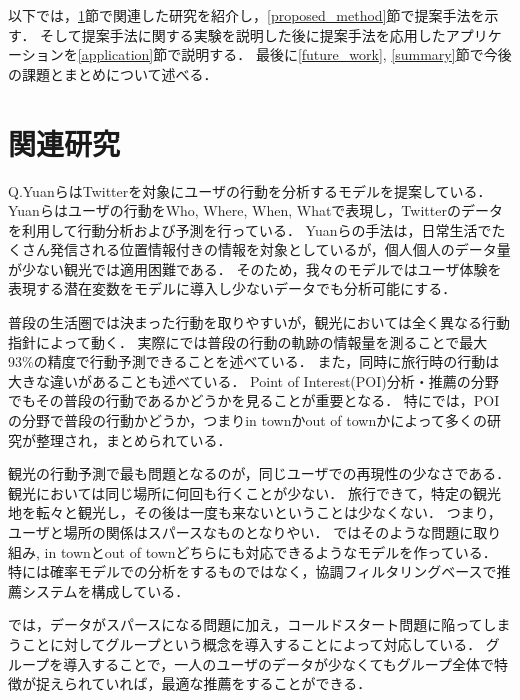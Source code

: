 \documentclass[a4j,10pt, twocolumn]{jarticle}
\begin{document}
以下では，\ref{related_work}節で関連した研究を紹介し，\ref{proposed_method}節で提案手法を示す．
そして提案手法に関する実験を説明した後に提案手法を応用したアプリケーションを\ref{application}節で説明する．
最後に\ref{future_work}, \ref{summary}節で今後の課題とまとめについて述べる．

\section{関連研究} \label{related_work}
Q.YuanらはTwitterを対象にユーザの行動を分析するモデルを提案している\cite{yuan2013and}\cite{yuan2015and}．
Yuanらはユーザの行動をWho, Where, When, Whatで表現し，Twitterのデータを利用して行動分析および予測を行っている．
Yuanらの手法は，日常生活でたくさん発信される位置情報付きの情報を対象としているが，個人個人のデータ量が少ない観光では適用困難である．
そのため，我々のモデルではユーザ体験を表現する潜在変数をモデルに導入し少ないデータでも分析可能にする．

普段の生活圏では決まった行動を取りやすいが，観光においては全く異なる行動指針によって動く．
実際に\cite{song2010limits}では普段の行動の軌跡の情報量を測ることで最大93\%の精度で行動予測できることを述べている．
また，同時に旅行時の行動は大きな違いがあることも述べている．
Point of Interest(POI)分析・推薦の分野でもその普段の行動であるかどうかを見ることが重要となる．
特に\cite{liu2017experimental}では，POIの分野で普段の行動かどうか，つまりin townかout of townかによって多くの研究が整理され，まとめられている．

観光の行動予測で最も問題となるのが，同じユーザでの再現性の少なさである．
観光においては同じ場所に何回も行くことが少ない．
旅行できて，特定の観光地を転々と観光し，その後は一度も来ないということは少なくない．
つまり，ユーザと場所の関係はスパースなものとなりやい．
\cite{ference2013location}\cite{yin2013lcars}\cite{wang2015geo}\cite{yin2016joint}ではそのような問題に取り組み, in townとout of townどちらにも対応できるようなモデルを作っている．
特に\cite{ference2013location}は確率モデルでの分析をするものではなく，協調フィルタリングベースで推薦システムを構成している．

\cite{wang2015geo}\cite{zhuang2017sns}\cite{ma2017}\cite{ma2019}では，データがスパースになる問題に加え，コールドスタート問題に陥ってしまうことに対してグループという概念を導入することによって対応している．
グループを導入することで，一人のユーザのデータが少なくてもグループ全体で特徴が捉えられていれば，最適な推薦をすることができる．

\end{document}
